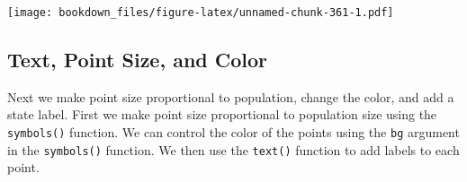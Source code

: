 \documentclass[
]{krantz}
\makeatletter
\newenvironment{Shaded}{\begin{snugshade}}{\end{snugshade}}
\newcommand{\DataTypeTok}[1]{\textcolor[rgb]{0.27,0.27,0.27}{#1}}
\newcommand{\DecValTok}[1]{\textcolor[rgb]{0.06,0.06,0.06}{#1}}
\newcommand{\KeywordTok}[1]{\textcolor[rgb]{0.27,0.27,0.27}{\textbf{#1}}}
\newcommand{\NormalTok}[1]{#1}
\newcommand{\OperatorTok}[1]{\textcolor[rgb]{0.43,0.43,0.43}{\textbf{#1}}}
\newcommand{\OtherTok}[1]{\textcolor[rgb]{0.37,0.37,0.37}{#1}}
\newcommand{\StringTok}[1]{\textcolor[rgb]{0.5,0.5,0.5}{#1}}
\newenvironment{kframe}{%
\medskip{}
\setlength{\fboxsep}{.8em}
 \def\at@end@of@kframe{}%
 \ifinner\ifhmode%
  \def\at@end@of@kframe{\end{minipage}}%
  \begin{minipage}{\columnwidth}%
 \fi\fi%
 \def\FrameCommand##1{\hskip\@totalleftmargin \hskip-\fboxsep
 \colorbox{shadecolor}{##1}\hskip-\fboxsep
     \hskip-\linewidth \hskip-\@totalleftmargin \hskip\columnwidth}%
 \MakeFramed {\advance\hsize-\width
   \@totalleftmargin\z@ \linewidth\hsize
   \@setminipage}}%
 {\par\unskip\endMakeFramed%
 \at@end@of@kframe}
\renewenvironment{Shaded}{\begin{kframe}}{\end{kframe}}
\makeatother
\begin{document}
\begin{Shaded}
\end{Shaded}

\texttt{[image: bookdown\_files/figure-latex/unnamed-chunk-361-1.pdf]}

\hypertarget{graphics6}{%
\subsection{Text, Point Size, and Color}\label{graphics6}}

Next we make point size proportional to population, change the color, and add a state label. First we make point size proportional to population size using the \texttt{symbols()} function. We can control the color of the points using the \texttt{bg} argument in the \texttt{symbols()} function. We then use the \texttt{text()} function to add labels to each point.
\end{document}
